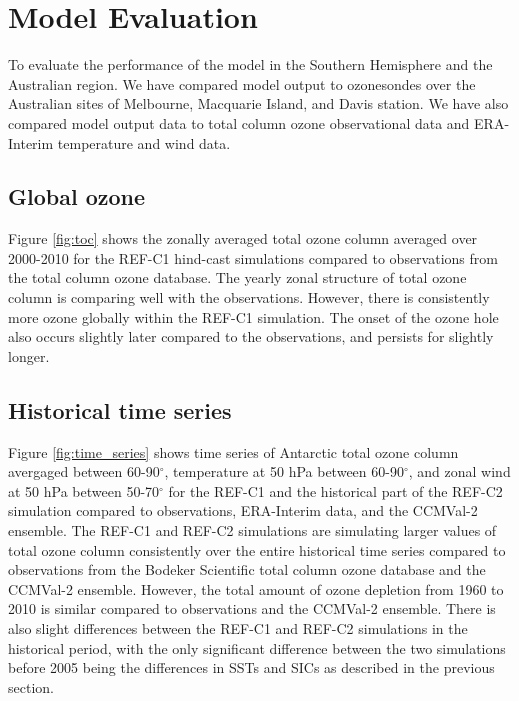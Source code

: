 \section{Model Evaluation}
To evaluate the performance of the model in the Southern Hemisphere and the Australian region. We have compared model output to ozonesondes over the Australian sites of Melbourne, Macquarie Island, and Davis station. We have also compared model output data to total column ozone observational data and ERA-Interim temperature and wind data. 

\subsection{Global ozone}
Figure \ref{fig:toc} shows the zonally averaged total ozone column averaged over 2000-2010 for the REF-C1 hind-cast simulations compared to observations from the total column ozone database. The yearly zonal structure of total ozone column is comparing well with the observations. However, there is consistently more ozone globally within the REF-C1 simulation. The onset of the ozone hole also occurs slightly later compared to the observations, and persists for slightly longer.

\subsection{Historical time series}
Figure \ref{fig:time_series} shows time series of Antarctic total ozone column avergaged between 60-90$^{\circ}$, temperature at 50 hPa between 60-90$^{\circ}$, and zonal wind at 50 hPa between 50-70$^{\circ}$ for the REF-C1 and the historical part of the REF-C2 simulation compared to observations, ERA-Interim data, and the CCMVal-2 ensemble. The REF-C1 and REF-C2 simulations are simulating larger values of total ozone column consistently over the entire historical time series compared to observations from the Bodeker Scientific total column ozone database and the CCMVal-2 ensemble. However, the total amount of ozone depletion from 1960 to 2010 is similar compared to observations and the CCMVal-2 ensemble. There is also slight differences between the REF-C1 and REF-C2 simulations in the historical period, with the only significant difference between the two simulations before 2005 being the differences in SSTs and SICs as described in the previous section.

